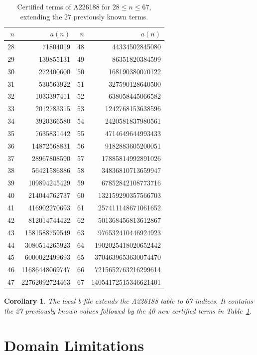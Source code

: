 \documentclass[11pt]{article}
\newtheorem{corollary}[theorem]{Corollary}
\theoremstyle{definition}
\theoremstyle{remark}
\begin{document}
\begin{table}[htbp]
\centering
\caption{Certified terms of A226188 for \(28\leq n\leq 67\), extending the 27 previously known terms.}
\label{tab:newterms}
\begin{tabular}{r r r r}
\toprule
\(n\) & \(a(n)\) & \(n\) & \(a(n)\)\\
\midrule
28 & 71804019 & 48 & 44334502845080\\
29 & 139855131 & 49 & 86351820384599\\
30 & 272400600 & 50 & 168190380070122\\
31 & 530563922 & 51 & 327590128640500\\
32 & 1033397411 & 52 & 638058445066582\\
33 & 2012783315 & 53 & 1242768153638596\\
34 & 3920366580 & 54 & 2420581837980561\\
35 & 7635831442 & 55 & 4714649644993433\\
36 & 14872568831 & 56 & 9182883605200051\\
37 & 28967808590 & 57 & 17885814992891026\\
38 & 56421586886 & 58 & 34836810713659947\\
39 & 109894245429 & 59 & 67852842108773716\\
40 & 214044762737 & 60 & 132159290357566703\\
41 & 416902270693 & 61 & 257411148671061652\\
42 & 812014744422 & 62 & 501368456813612867\\
43 & 1581588759549 & 63 & 976532410446924923\\
44 & 3080514265923 & 64 & 1902025418020652442\\
45 & 6000022499693 & 65 & 3704639653630074470\\
46 & 11686448069747 & 66 & 7215652763216299614\\
47 & 22762092724463 & 67 & 14054172515346621401\\
\bottomrule
\end{tabular}
\end{table}

\begin{corollary}
The local b-file  extends the A226188 table to 67
indices.  It contains the 27 previously known values followed by the 40 new
certified terms in Table~\ref{tab:newterms}.
\end{corollary}

\section{Domain Limitations}
\end{document}
